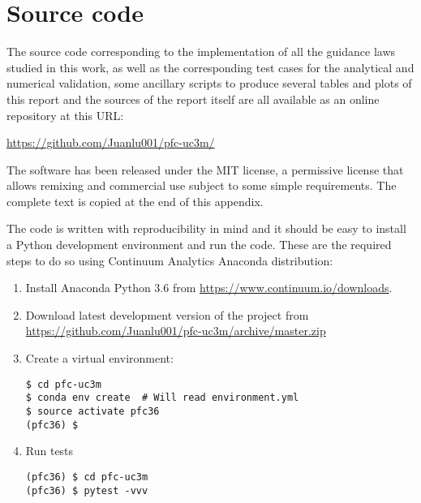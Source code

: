 \chapter{Source code} \label{sec:software}

The source code corresponding to the implementation of all the guidance laws studied in this work, as well as the corresponding test cases for the analytical and numerical validation, some ancillary scripts to produce several tables and plots of this report and the sources of the report itself are all available as an online repository at this URL:

\vspace{0.5cm}
\url{https://github.com/Juanlu001/pfc-uc3m/}
\vspace{0.5cm}

The software has been released under the MIT license, a permissive license that allows remixing and commercial use subject to some simple requirements. The complete text is copied at the end of this appendix.

The code is written with reproducibility in mind and it should be easy to install a Python development environment and run the code. These are the required steps to do so using Continuum Analytics Anaconda distribution:

\begin{enumerate}
\item Install Anaconda Python 3.6 from \url{https://www.continuum.io/downloads}.

\item Download latest development version of the project from \url{https://github.com/Juanlu001/pfc-uc3m/archive/master.zip}

\item Create a virtual environment:

\begin{verbatim}
$ cd pfc-uc3m
$ conda env create  # Will read environment.yml
$ source activate pfc36
(pfc36) $
\end{verbatim}

\item Run tests

\begin{verbatim}
(pfc36) $ cd pfc-uc3m
(pfc36) $ pytest -vvv
\end{verbatim}

\end{enumerate}

\clearpage

